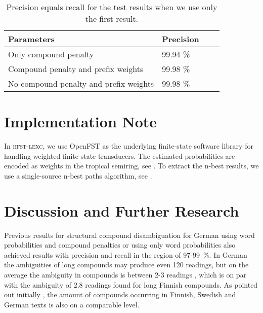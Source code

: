 \documentclass[postprint]{flammie}
\begin{document}
\begin{table}[htb!]
  \begin{small}
    \begin{tabular}{|l|l|l|l|}
      \hline 
      Parameters & Precision \\
      \hline 
      Only compound penalty & 99.94 \% \\
      Compound penalty and prefix weights & 99.98 \% \\
      No compound penalty and prefix weights & 99.98 \% \\
      \hline 
    \end{tabular}
    \caption{Precision equals recall for the test results when we use
      only the first result.
    }\label{tab:results}
  \end{small}
\end{table}

\section{Implementation Note}
\label{Sect6}

In \textsc{hfst-lexc}, we use OpenFST \cite{openfst/2007} as the underlying
finite-state software library for handling weighted finite-state
transducers. The estimated probabilities are encoded as weights in the
tropical semiring, see \cite{mohri/1997}. To extract the n-best
results, we use a single-source n-best paths algorithm, see
\cite{mohri/2002}.

\section{Discussion and Further Research}
\label{Sect7}

Previous results for structural compound disambiguation for German
using word probabilities and compound penalties \cite{schiller/2005} or
using only word probabilities \cite{marek/2006} also achieved results
with precision and recall in the region of 97-99~\%. In German the
ambiguities of long compounds may produce even 120 readings, but on
the average the ambiguity in compounds is between 2-3 readings
\cite{schiller/2005}, which is on par with the ambiguity of 2.8
readings found for long Finnish compounds. As pointed out initially
\cite{hedlund/2002}, the amount of compounds occurring in Finnish,
Swedish and German texts is also on a comparable level.
\end{document}
